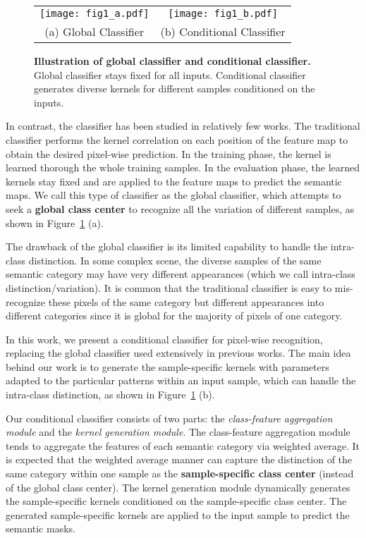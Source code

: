 \documentclass[journal]{IEEEtran}
\newcommand{\ra}[1]{\renewcommand{\arraystretch}{#1}}
\begin{document}
\begin{figure}[t]
\footnotesize
\centering
\renewcommand{\tabcolsep}{1pt} \ra{1} \begin{center}
\begin{tabular}{cc}
\texttt{[image: fig1\_a.pdf]} &
\texttt{[image: fig1\_b.pdf]} \\
(a) Global Classifier &
(b) Conditional Classifier \\
\end{tabular}
\end{center}
\caption{\textbf{Illustration of global classifier and conditional classifier.}
Global classifier stays fixed for all inputs.
Conditional classifier generates diverse kernels for different samples conditioned on the inputs.}
\label{fig:fig1}
\end{figure}

In contrast, 
the classifier has been studied in relatively few works.
The traditional classifier 
performs the kernel correlation 
on each position of the feature map 
to obtain the desired pixel-wise prediction.
In the training phase,
the kernel is learned thorough the whole training samples.
In the evaluation phase,
the learned kernels stay fixed 
and are applied to the feature maps
to predict the semantic maps.
We call this type of classifier as the global classifier,
which attempts to seek a \textbf{global class center} 
to recognize all the variation of different samples,
as shown in Figure~\ref{fig:fig1} (a).

The drawback of the global classifier is 
its limited capability 
to handle the intra-class distinction.
In some complex scene,
the diverse samples of the same semantic category
may have very different appearances 
(which we call intra-class distinction/variation).
It is common that the traditional classifier
is easy to mis-recognize these pixels 
of the same category but different appearances into
different categories 
since it is global for the majority of pixels of one category.

In this work, 
we present a conditional classifier for 
pixel-wise recognition, 
replacing the global classifier 
used extensively in previous works.
The main idea behind our work
is to generate the sample-specific kernels
with parameters adapted to 
the particular patterns within an input sample, 
which can handle the intra-class distinction,
as shown in Figure~\ref{fig:fig1} (b).

Our conditional classifier consists of two parts:
the \emph{class-feature aggregation module}
and
the \emph{kernel generation module}.
The class-feature aggregation module
tends to aggregate the features of each semantic category
via weighted average.
It is expected that 
the weighted average manner 
can capture the distinction of the same category within one sample
as the \textbf{sample-specific class center} (instead of the global class center).
The kernel generation module
dynamically generates the sample-specific kernels 
conditioned on the sample-specific class center.
The generated sample-specific kernels 
are applied to the input sample
to predict the semantic masks. 
\end{document}
